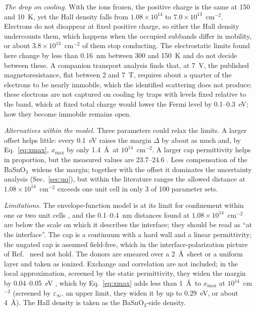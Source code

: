 \documentclass[11pt]{article}
\newcommand{\BSO}{\texorpdfstring{BaSnO$_3$}{BaSnO3}}
\newcommand{\xmax}{x_\mathrm{max}}
\begin{document}
\emph{The drop on cooling.} With the ions frozen, the positive charge is the same at 150 and 10~K, yet the Hall density falls from $1.08\times10^{14}$ to $7.0\times10^{13}$~cm$^{-2}$. Electrons do not disappear at fixed positive charge, so either the Hall density undercounts them, which happens when the occupied subbands differ in mobility, or about $3.8\times10^{13}$~cm$^{-2}$ of them stop conducting. The electrostatic limits found here change by less than 0.16~nm between 300 and 150~K and do not decide between these. A companion transport analysis \cite{OwnbyMAT03} finds that, at 7~V, the published magnetoresistance, flat between 2 and 7~T, requires about a quarter of the electrons to be nearly immobile, which the identified scattering does not produce; these electrons are not captured on cooling by traps with levels fixed relative to the band, which at fixed total charge would lower the Fermi level by 0.1--0.3~eV; how they become immobile remains open.

\emph{Alternatives within the model.} Three parameters could relax the limits. A larger offset helps little: every 0.1~eV raises the margin $\Delta$ by about as much and, by Eq.~\eqref{eq:xmax}, $\xmax$ by only 1.4~\AA\ at $10^{14}$~cm$^{-2}$. A larger cap permittivity helps in proportion, but the measured values are 23.7--24.6 \cite{Jang2017LIO,Galazka2021}. Less compensation of the \BSO\ widens the margin; together with the offset it dominates the uncertainty analysis (Sec.~\ref{sec:uq}), but within the literature ranges the allowed distance at $1.08\times10^{14}$~cm$^{-2}$ exceeds one unit cell in only 3 of 100 parameter sets.

\emph{Limitations.} The envelope-function model is at its limit for confinement within one or two unit cells \cite{OwnbyMAT01}, and the 0.1--0.4~nm distances found at $1.08\times10^{14}$~cm$^{-2}$ are below the scale on which it describes the interface; they should be read as ``at the interface''. The cap is a continuum with a hard wall and a linear permittivity; the ungated cap is assumed field-free, which in the interface-polarization picture of Ref.~\cite{Kim2019LIO} need not hold. The donors are smeared over a 2~\AA\ sheet or a uniform layer and taken as ionized. Exchange and correlation are not included; in the local approximation, screened by the static permittivity, they widen the margin by 0.04--0.05~eV \cite{OwnbyMAT01}, which by Eq.~\eqref{eq:xmax} adds less than 1~\AA\ to $\xmax$ at $10^{14}$~cm$^{-2}$ (screened by $\varepsilon_\infty$, an upper limit, they widen it by up to 0.29~eV, or about 4~\AA). The Hall density is taken as the \BSO-side density.
\end{document}
